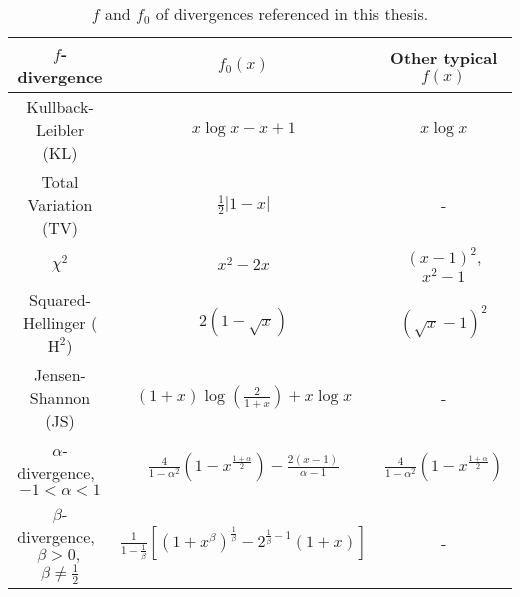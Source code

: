 %








{
\renewcommand{\arraystretch}{2}
\begin{table}
 \caption{$f$ and $f_0$ of divergences referenced in this thesis.}
 \label{table:f-fns}
 \centering
 \begin{tabular}{c c c} 
 \toprule
 $f$-divergence & $f_0(x)$ & Other typical $f(x)$ \\
 \midrule
 Kullback-Leibler (KL) & $x \log x - x + 1$ & $x \log x$\\
 Total Variation (TV) & $\frac{1}{2}|1-x|$& - \\
 $\chi^2$ & $x^2 - 2x$& $(x-1)^2$,\: $x^2 -1$\\
 Squared-Hellinger ($\text{H}^2$) & $2(1-\sqrt{x})$&  $(\sqrt{x} - 1)^2$\\
 Jensen-Shannon (JS) & $(1+x)\log(\frac{2}{1+x}) + x\log x$& -\\
 $\alpha$-divergence, \,
 $-1<\alpha < 1$ & $\frac{4}{1-\alpha^2}\left( 1 - x^{\frac{1+\alpha}{2}} \right) - \frac{2(x-1)}{\alpha-1}$ & $\frac{4}{1-\alpha^2}\left( 1 - x^{\frac{1+\alpha}{2}} \right)$\\
 $\beta$-divergence, \,
 $\beta > 0,$ $\beta\not=\frac{1}{2}$ & $\frac{1}{1-\frac{1}{\beta}}\left[ (1+x^\beta)^{\frac{1}{\beta}} - 2^{\frac{1}{\beta}-1}(1+x) \right]$& -\\
 \bottomrule
\end{tabular}
\end{table}
}


